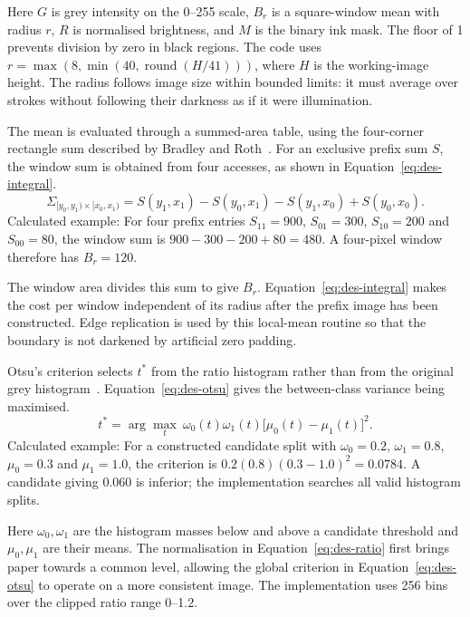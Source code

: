 Here $G$ is grey intensity on the 0--255 scale, $B_r$ is a square-window mean with radius $r$, $R$ is normalised brightness, and $M$ is the binary ink mask. The floor of 1 prevents division by zero in black regions. The code uses $r=\max(8,\min(40,\operatorname{round}(H/41)))$, where $H$ is the working-image height. The radius follows image size within bounded limits: it must average over strokes without following their darkness as if it were illumination.

The mean is evaluated through a summed-area table, using the four-corner rectangle sum described by Bradley and Roth~\cite[PDF p.~2, Eq.~(2)]{bradley2007}. For an exclusive prefix sum $S$, the window sum is obtained from four accesses, as shown in Equation~\ref{eq:des-integral}.
\begin{equation}
\Sigma_{[y_0,y_1)\times[x_0,x_1)}=
S(y_1,x_1)-S(y_0,x_1)-S(y_1,x_0)+S(y_0,x_0).
\label{eq:des-integral}
\end{equation}
Calculated example: For four prefix entries $S_{11}=900$, $S_{01}=300$, $S_{10}=200$ and $S_{00}=80$, the window sum is $900-300-200+80=480$. A four-pixel window therefore has $B_r=120$.

The window area divides this sum to give $B_r$. Equation~\ref{eq:des-integral} makes the cost per window independent of its radius after the prefix image has been constructed. Edge replication is used by this local-mean routine so that the boundary is not darkened by artificial zero padding.

Otsu's criterion selects $t^*$ from the ratio histogram rather than from the original grey histogram~\cite[page to verify]{otsu1979}. Equation~\ref{eq:des-otsu} gives the between-class variance being maximised.
\begin{equation}
t^*=\arg\max_t\ \omega_0(t)\omega_1(t)
\bigl[\mu_0(t)-\mu_1(t)\bigr]^2.
\label{eq:des-otsu}
\end{equation}
Calculated example: For a constructed candidate split with $\omega_0=0.2$, $\omega_1=0.8$, $\mu_0=0.3$ and $\mu_1=1.0$, the criterion is $0.2(0.8)(0.3-1.0)^2=0.0784$. A candidate giving 0.060 is inferior; the implementation searches all valid histogram splits.

Here $\omega_0,\omega_1$ are the histogram masses below and above a candidate threshold and $\mu_0,\mu_1$ are their means. The normalisation in Equation~\ref{eq:des-ratio} first brings paper towards a common level, allowing the global criterion in Equation~\ref{eq:des-otsu} to operate on a more consistent image. The implementation uses 256 bins over the clipped ratio range 0--1.2.

